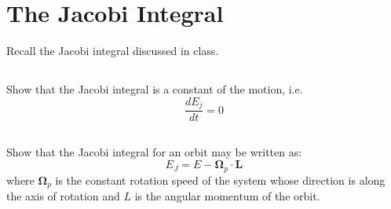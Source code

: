 \section{The Jacobi Integral}

Recall the Jacobi integral discussed in class.
\subsection{}
Show that the Jacobi integral is a constant of the motion, i.e.
\begin{equation}
    \frac{dE_j}{dt}=0
\end{equation}





\subsection{}

Show that the Jacobi integral for an orbit may be written as:
\begin{equation}
    E_J = E - \mathbf{\Omega}_p \cdot \mathbf{L}
\end{equation}
where $\mathbf{\Omega}_p$ is the constant rotation speed of the system whose direction is along the axis of rotation and $L$ is the angular momentum of the orbit.